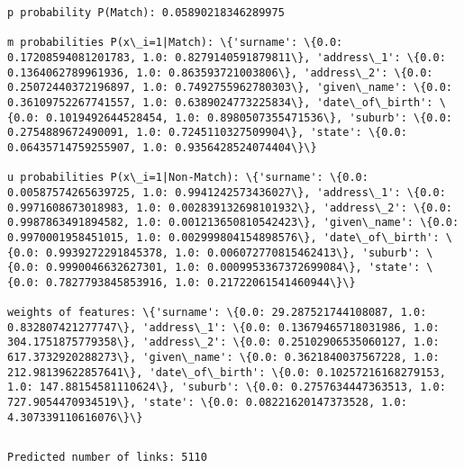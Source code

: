 \documentclass{article}
\begin{document}
    \begin{Verbatim}[commandchars=\\\{\}]
p probability P(Match): 0.05890218346289975

m probabilities P(x\_i=1|Match): \{'surname': \{0.0: 0.17208594081201783, 1.0: 0.8279140591879811\}, 'address\_1': \{0.0: 0.1364062789961936, 1.0: 0.863593721003806\}, 'address\_2': \{0.0: 0.25072440372196897, 1.0: 0.7492755962780303\}, 'given\_name': \{0.0: 0.36109752267741557, 1.0: 0.6389024773225834\}, 'date\_of\_birth': \{0.0: 0.1019492644528454, 1.0: 0.8980507355471536\}, 'suburb': \{0.0: 0.2754889672490091, 1.0: 0.7245110327509904\}, 'state': \{0.0: 0.06435714759255907, 1.0: 0.9356428524074404\}\}

u probabilities P(x\_i=1|Non-Match): \{'surname': \{0.0: 0.00587574265639725, 1.0: 0.9941242573436027\}, 'address\_1': \{0.0: 0.9971608673018983, 1.0: 0.002839132698101932\}, 'address\_2': \{0.0: 0.9987863491894582, 1.0: 0.001213650810542423\}, 'given\_name': \{0.0: 0.9970001958451015, 1.0: 0.002999804154898576\}, 'date\_of\_birth': \{0.0: 0.9939272291845378, 1.0: 0.006072770815462413\}, 'suburb': \{0.0: 0.9990046632627301, 1.0: 0.0009953367372699084\}, 'state': \{0.0: 0.7827793845853916, 1.0: 0.21722061541460944\}\}

weights of features: \{'surname': \{0.0: 29.287521744108087, 1.0: 0.832807421277747\}, 'address\_1': \{0.0: 0.13679465718031986, 1.0: 304.1751875779358\}, 'address\_2': \{0.0: 0.25102906535060127, 1.0: 617.3732920288273\}, 'given\_name': \{0.0: 0.3621840037567228, 1.0: 212.98139622857641\}, 'date\_of\_birth': \{0.0: 0.10257216168279153, 1.0: 147.88154581110624\}, 'suburb': \{0.0: 0.2757634447363513, 1.0: 727.9054470934519\}, 'state': \{0.0: 0.08221620147373528, 1.0: 4.307339110616076\}\}

    \end{Verbatim}

    \begin{Verbatim}[commandchars=\\\{\}]

\end{Verbatim}

    \begin{Verbatim}[commandchars=\\\{\}]
Predicted number of links: 5110

    \end{Verbatim}

    \begin{Verbatim}[commandchars=\\\{\}]

\end{Verbatim}
\end{document}
